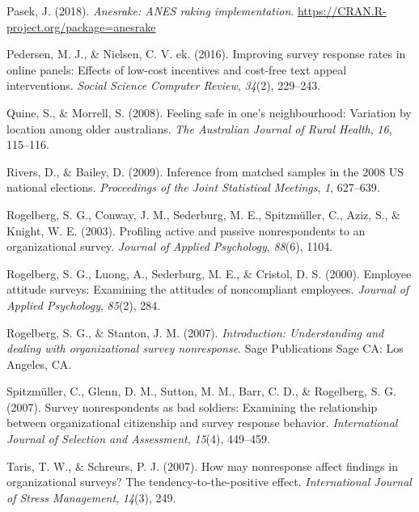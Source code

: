 \documentclass[
  man,mask]{apa7}
\newlength{\cslhangindent}
\newenvironment{CSLReferences}[2] %
 {\begin{list}{}{%
  \setlength{\itemindent}{0pt}
  \setlength{\leftmargin}{0pt}
  \setlength{\parsep}{0pt}
  \ifodd #1
   \setlength{\leftmargin}{\cslhangindent}
   \setlength{\itemindent}{-1\cslhangindent}
  \fi
  \setlength{\itemsep}{#2\baselineskip}}}
 {\end{list}}
\begin{document}
\begin{CSLReferences}{1}{0}
Pasek, J. (2018). \emph{Anesrake: ANES raking implementation}. \url{https://CRAN.R-project.org/package=anesrake}

Pedersen, M. J., \& Nielsen, C. V. ek. (2016). Improving survey response rates in online panels: Effects of low-cost incentives and cost-free text appeal interventions. \emph{Social Science Computer Review}, \emph{34}(2), 229--243.

Quine, S., \& Morrell, S. (2008). Feeling safe in one's neighbourhood: Variation by location among older australians. \emph{The Australian Journal of Rural Health}, \emph{16}, 115--116.

Rivers, D., \& Bailey, D. (2009). Inference from matched samples in the 2008 {US} national elections. \emph{Proceedings of the Joint Statistical Meetings}, \emph{1}, 627--639.

Rogelberg, S. G., Conway, J. M., Sederburg, M. E., Spitzmüller, C., Aziz, S., \& Knight, W. E. (2003). Profiling active and passive nonrespondents to an organizational survey. \emph{Journal of Applied Psychology}, \emph{88}(6), 1104.

Rogelberg, S. G., Luong, A., Sederburg, M. E., \& Cristol, D. S. (2000). Employee attitude surveys: Examining the attitudes of noncompliant employees. \emph{Journal of Applied Psychology}, \emph{85}(2), 284.

Rogelberg, S. G., \& Stanton, J. M. (2007). \emph{Introduction: Understanding and dealing with organizational survey nonresponse}. Sage Publications Sage {CA}: Los Angeles, {CA}.

Spitzmüller, C., Glenn, D. M., Sutton, M. M., Barr, C. D., \& Rogelberg, S. G. (2007). Survey nonrespondents as bad soldiers: Examining the relationship between organizational citizenship and survey response behavior. \emph{International Journal of Selection and Assessment}, \emph{15}(4), 449--459.

Taris, T. W., \& Schreurs, P. J. (2007). How may nonresponse affect findings in organizational surveys? The tendency-to-the-positive effect. \emph{International Journal of Stress Management}, \emph{14}(3), 249.


\end{CSLReferences}
\end{document}
